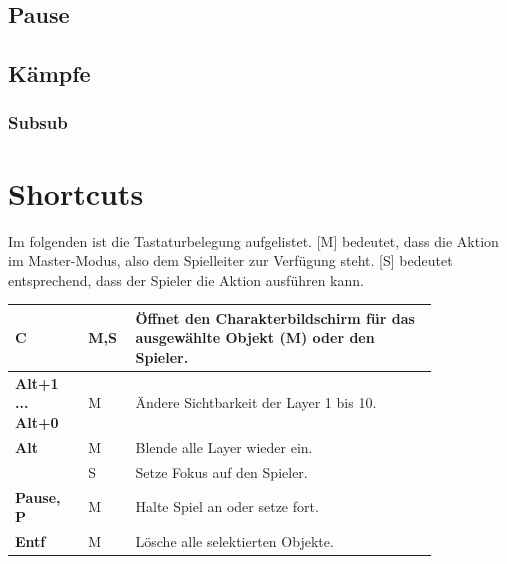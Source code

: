 \documentclass[german,10pt,a4paper,twocolumn,colorscheme=darkblue]{orarticle}
\begin{document}
		\subsection{Pause}
		\subsection{Kämpfe}
			\subsubsection{Subsub}
			
	\section{Shortcuts}
		Im folgenden ist die Tastaturbelegung aufgelistet. [M] bedeutet, dass die Aktion im Master-Modus, also dem Spielleiter zur Verfügung steht. [S] bedeutet entsprechend, dass der Spieler die Aktion ausführen kann.\\
		
		\begin{tabular}{p{0.15\linewidth}|p{0.075\linewidth}|p{0.62\linewidth}}
			\textbf{C}               & M,S & Öffnet den Charakterbildschirm für das ausgewählte Objekt (M) oder den Spieler. \\\hline
			\textbf{Alt+1 ... Alt+0} & M & Ändere Sichtbarkeit der Layer 1 bis 10. \\\hline
			\textbf{Alt}             & M & Blende alle Layer wieder ein.\\
			                         & S & Setze Fokus auf den Spieler.\\\hline
			\textbf{Pause, P}		 & M & Halte Spiel an oder setze fort.\\\hline
			\textbf{Entf}			 & M & Lösche alle selektierten Objekte.
		\end{tabular}
	
	
\end{document}
